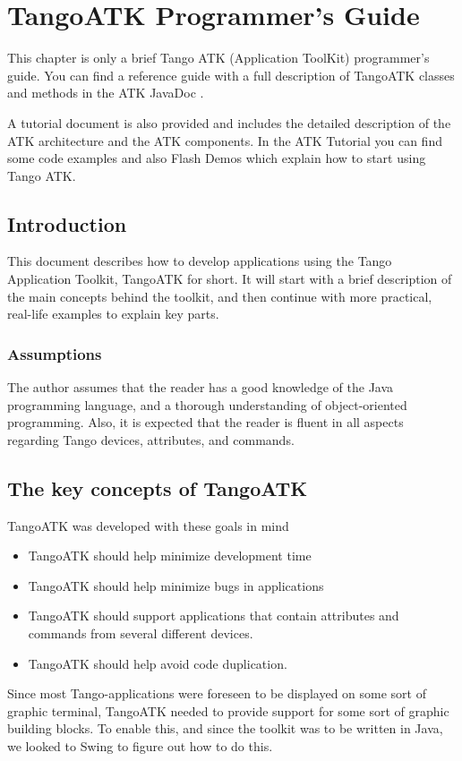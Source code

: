 
\chapter{TangoATK Programmer's Guide}

This chapter is only a brief Tango ATK (Application ToolKit) programmer's
guide. You can find a reference guide with a full description of TangoATK
classes and methods in the ATK JavaDoc \cite{ATK-doc}.

A tutorial document \cite{ATK-Tutorial} is also provided and includes
the detailed description of the ATK architecture and the ATK components.
In the ATK Tutorial \cite{ATK-Tutorial} you can find some code examples
and also Flash Demos which explain how to start using Tango ATK.

\section{Introduction}

This document describes how to develop applications using the Tango
Application Toolkit, TangoATK for short. It will start with a brief
description of the main concepts behind the toolkit, and then continue
with more practical, real-life examples to explain key parts.

\subsection{Assumptions}

The author assumes that the reader has a good knowledge of the Java
programming language, and a thorough understanding of object-oriented
programming. Also, it is expected that the reader is fluent in all
aspects regarding Tango devices, attributes, and commands.

\section{The key concepts of TangoATK}

TangoATK was developed with these goals in mind
\begin{itemize}
\item TangoATK should help minimize development time 
\item TangoATK should help minimize bugs in applications 
\item TangoATK should support applications that contain attributes and commands
from several different devices. 
\item TangoATK should help avoid code duplication. 
\end{itemize}
Since most Tango-applications were foreseen to be displayed on some
sort of graphic terminal, TangoATK needed to provide support for some
sort of graphic building blocks. To enable this, and since the toolkit
was to be written in Java, we looked to Swing to figure out how to
do this.

